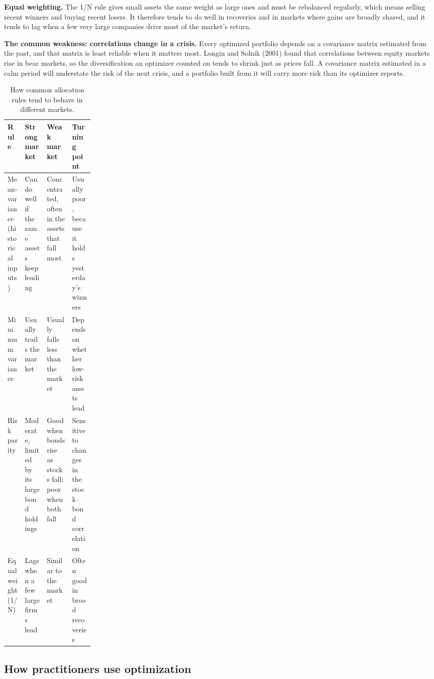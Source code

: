 \textbf{Equal weighting.} The 1/N rule gives small assets the same weight as large ones and must be rebalanced regularly, which means selling recent winners and buying recent losers. It therefore tends to do well in recoveries and in markets where gains are broadly shared, and it tends to lag when a few very large companies drive most of the market's return.

\textbf{The common weakness: correlations change in a crisis.} Every optimized portfolio depends on a covariance matrix estimated from the past, and that matrix is least reliable when it matters most. Longin and Solnik (2001) found that correlations between equity markets rise in bear markets, so the diversification an optimizer counted on tends to shrink just as prices fall. A covariance matrix estimated in a calm period will understate the risk of the next crisis, and a portfolio built from it will carry more risk than its optimizer reports. 

\begin{table}[htbp]
\centering
\small
\caption{How common allocation rules tend to behave in different markets.}
\label{tab:12-regimes}
\begin{tabularx}{0.95\linewidth}{@{}>{\raggedright\arraybackslash}p{0.2\linewidth}>{\raggedright\arraybackslash}X>{\raggedright\arraybackslash}X>{\raggedright\arraybackslash}X@{}}
\toprule
Rule & Strong market & Weak market & Turning point \\
\midrule
Mean-variance (historical inputs) & Can do well if the same assets keep leading & Concentrated, often in the assets that fall most & Usually poor, because it holds yesterday's winners \\
Minimum variance & Usually trails the market & Usually falls less than the market & Depends on whether low-risk assets lead \\
Risk parity & Moderate, limited by its large bond holdings & Good when bonds rise as stocks fall; poor when both fall & Sensitive to changes in the stock--bond correlation \\
Equal weight (1/N) & Lags when a few large firms lead & Similar to the market & Often good in broad recoveries \\
\bottomrule
\end{tabularx}
\end{table}

\subsection{How practitioners use optimization}
\label{sec:12-practice}

